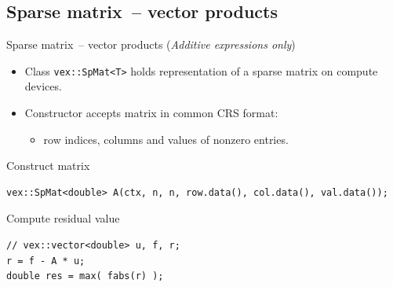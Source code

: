 \documentclass[@BEAMER_OPTIONS@]{beamer}
\newcommand{\code}[1]{\lstinline|#1|}
\newcommand{\additive}{\hspace{1cm}\footnotesize(\emph{Additive expressions only})}
\begin{document}
\subsection{Sparse matrix~-- vector products}

\begin{frame}[fragile]{Sparse matrix~-- vector products \additive}
    \begin{itemize}
        \item Class \code{vex::SpMat<T>} holds representation of a sparse
            matrix on compute devices.
        \item Constructor accepts matrix in common CRS format:
            \begin{itemize}
                \item row indices, columns and values of nonzero entries.
            \end{itemize}
    \end{itemize}
    \begin{exampleblock}{Construct matrix}
        \begin{lstlisting}
vex::SpMat<double> A(ctx, n, n, row.data(), col.data(), val.data());
        \end{lstlisting}
    \end{exampleblock}

    \begin{exampleblock}{Compute residual value}
        \begin{lstlisting}[firstnumber=last]
// vex::vector<double> u, f, r;
r = f - A * u;
double res = max( fabs(r) );
        \end{lstlisting}
    \end{exampleblock}
\end{frame}

\end{document}
